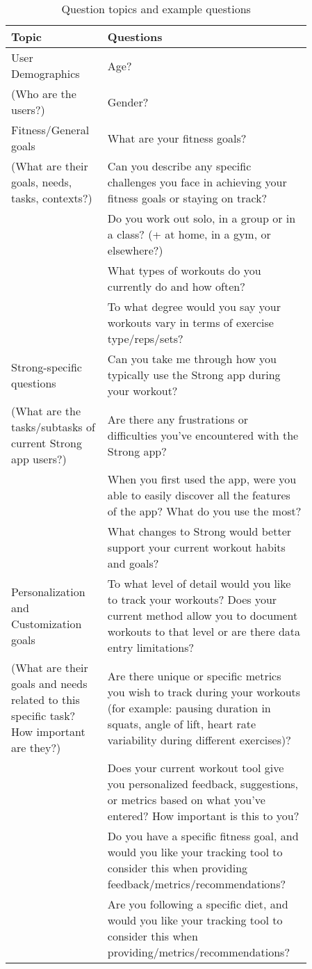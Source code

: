\documentclass[
	letterpaper, %
]{jdf}
\begin{document}
\begin{table}[H] %
	\caption{Question topics and example questions}
	\small %
	\centering %
	\begin{tabular}{L{0.30\linewidth} L{0.56\linewidth}}
		\textbf{Topic} & \textbf{Questions} \\
		\toprule[0.5pt]
		User Demographics & Age?\\
		(Who are the users?) & Gender?\\
		\midrule
		Fitness/General goals & What are your fitness goals?\\
		(What are their goals, needs, tasks, contexts?)& Can you describe any specific challenges you face in achieving your fitness goals or staying on track?\\
		& Do you work out solo, in a group or in a class? (+ at home, in a gym, or elsewhere?)\\
		& What types of workouts do you currently do and how often?\\
		& To what degree would you say your workouts vary in terms of exercise type/reps/sets?\\
		\midrule
		Strong-specific questions & Can you take me through how you typically use the Strong app during your workout?\\
		(What are the tasks/subtasks of current Strong app users?)& Are there any frustrations or difficulties you've encountered with the Strong app?\\
		& When you first used the app, were you able to easily discover all the features of the app? What do you use the most?\\
		& What changes to Strong would better support your current workout habits and goals?\\
		\midrule
		Personalization and Customization goals & To what level of detail would you like to track your workouts? Does your current method allow you to document workouts to that level or are there data entry limitations?\\
		(What are their goals and needs related to this specific task? How important are they?)& Are there unique or specific metrics you wish to track during your workouts (for example: pausing duration in squats, angle of lift, heart rate variability during different exercises)?\\
		& Does your current workout tool give you personalized feedback, suggestions, or metrics based on what you've entered? How important is this to you?\\
		& Do you have a specific fitness goal, and would you like your tracking tool to consider this when providing feedback/metrics/recommendations?\\
		& Are you following a specific diet, and would you like your tracking tool to consider this when providing/metrics/recommendations?\\
	\end{tabular}
\end{table}
\end{document}
